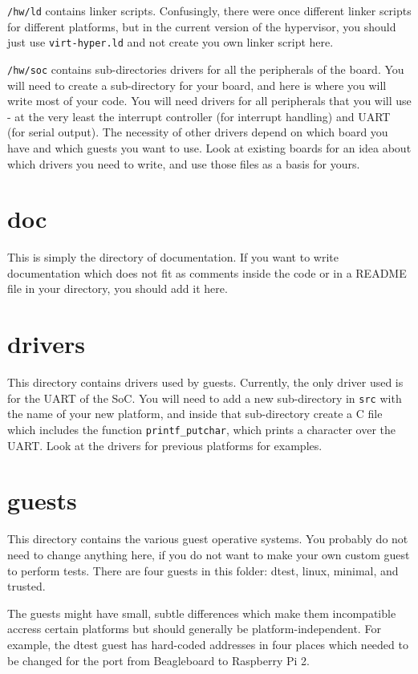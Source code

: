 \documentclass[a4paper,11pt,reqno]{amsart}
\begin{document}
\texttt{/hw/ld} contains linker scripts. Confusingly, there were once different linker scripts for different platforms, but in the current version of the hypervisor, you should just use \texttt{virt-hyper.ld} and not create you own linker script here.

\texttt{/hw/soc} contains sub-directories drivers for all the peripherals of the board. You will need to create a sub-directory for your board, and here is where you will write most of your code. You will need drivers for all peripherals that you will use - at the very least the interrupt controller (for interrupt handling) and UART (for serial output). The necessity of other drivers depend on which board you have and which guests you want to use. Look at existing boards for an idea about which drivers you need to write, and use those files as a basis for yours.

\section{doc}

This is simply the directory of documentation. If you want to write documentation which does not fit as comments inside the code or in a README file in your directory, you should add it here.

\section{drivers}

This directory contains drivers used by guests. Currently, the only driver used is for the UART of the SoC. You will need to add a new sub-directory in \texttt{src} with the name of your new platform, and inside that sub-directory create a C file which includes the function \texttt{printf_putchar}, which prints a character over the UART. Look at the drivers for previous platforms for examples.

\section{guests}

This directory contains the various guest operative systems. You probably do not need to change anything here, if you do not want to make your own custom guest to perform tests. There are four guests in this folder: dtest, linux, minimal, and trusted.

The guests might have small, subtle differences which make them incompatible accress certain platforms but should generally be platform-independent. For example, the dtest guest has hard-coded addresses in four places which needed to be changed for the port from Beagleboard to Raspberry Pi 2.
\end{document}
